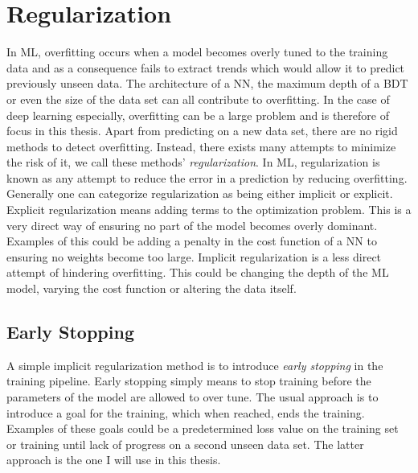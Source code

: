 \section{Regularization}\label{sec:Regularization}
In \ac{ML}, overfitting occurs when a model becomes overly tuned to the training data and as a consequence 
fails to extract trends which would allow it to predict previously unseen data. The architecture of a \ac{NN}, 
the maximum depth of a \ac{BDT} or even the size of the data set can all contribute to overfitting. In the 
case of deep learning especially, overfitting can be a large problem and is therefore of focus in this thesis. Apart 
from predicting on a new data set, there are no rigid methods to detect overfitting. Instead, there exists many 
attempts to minimize the risk of it, we call these methods' \emph{regularization}. In \ac{ML}, regularization 
is known as any attempt to reduce the error in a prediction by reducing overfitting. Generally one can categorize
regularization as being either implicit or explicit. Explicit regularization means adding terms to the optimization 
problem. This is a very direct way of ensuring no part of the model becomes overly dominant. Examples of this 
could be adding a penalty in the cost function of a \ac{NN} to ensuring no weights become too large. Implicit
regularization is a less direct attempt of hindering overfitting. This could be changing the depth of the \ac{ML} model,
varying the cost function or altering the data itself.
\subsection{Early Stopping}\label{subsec:EarlyStopping}
A simple implicit regularization method is to introduce \emph{early stopping} in the training pipeline. Early stopping 
simply means to stop training before the parameters of the model are allowed to over tune. The usual approach 
is to introduce a goal for the training, which when reached, ends the training. Examples of these goals could be a 
predetermined loss value on the training set or training until lack of progress on a second unseen data set. The latter
approach is the one I will use in this thesis. 
